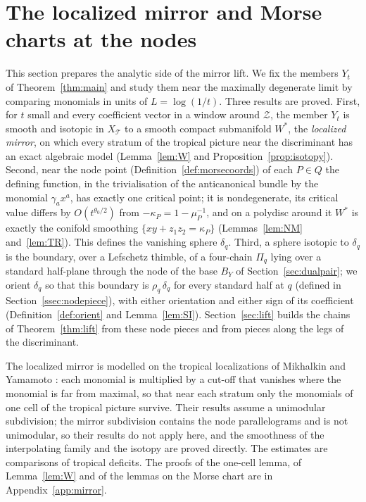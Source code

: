 \section{The localized mirror and Morse charts at the nodes}\label{sec:regime}

This section prepares the analytic side of the mirror lift. We fix the members $Y_t$ of Theorem~\ref{thm:main} and
study them near the maximally degenerate limit by comparing monomials in units of $L=\log(1/t)$. Three results are
proved. First, for $t$ small and every coefficient vector in a window around $\mathcal Z$, the member $Y_t$ is smooth
and isotopic in $X_{\mathcal T}$ to a smooth compact submanifold $W^*$, the \emph{localized mirror}, on which every
stratum of the tropical picture near the discriminant has an exact algebraic model (Lemma~\ref{lem:W} and
Proposition~\ref{prop:isotopy}). Second, near the node point (Definition~\ref{def:morsecoords}) of each $P\in Q$ the defining function,
in the trivialisation of the anticanonical bundle by the monomial $\gamma_ax^a$, has exactly one critical point; it is nondegenerate, its critical value differs by $O(t^{\theta_0/2})$ from $-\kappa_P=1-\mu_P^{-1}$,
and on a polydisc around it $W^*$ is exactly the conifold smoothing $\{xy+z_1z_2=\kappa_P\}$ (Lemmas~\ref{lem:NM}
and~\ref{lem:TR}). This defines the vanishing sphere $\delta_q$. Third, a sphere isotopic to $\delta_q$ is the
boundary, over a Lefschetz thimble, of a four-chain $\Pi_q$ lying over a standard half-plane through the node of the
base $B_Y$ of Section~\ref{sec:dualpair}; we orient $\delta_q$ so that this boundary is $\rho_q\,\delta_q$ for every
standard half at $q$ (defined in Section~\ref{ssec:nodepiece}), with either orientation and either sign of its coefficient (Definition~\ref{def:orient} and
Lemma~\ref{lem:SI}). Section~\ref{sec:lift} builds the chains of Theorem~\ref{thm:lift} from these node pieces and from
pieces along the legs of the discriminant.

The localized mirror is modelled on the tropical localizations of Mikhalkin \cite{Mikhalkin} and Yamamoto
\cite[Def.~3.1]{Ya16}: each monomial is multiplied by a cut-off that vanishes where the monomial is far from maximal, so
that near each stratum only the monomials of one cell of the tropical picture survive. Their results assume a unimodular
subdivision; the mirror subdivision contains the node parallelograms and is not unimodular, so their results do not
apply here, and the smoothness of the interpolating family and the isotopy are proved directly. The estimates are comparisons of tropical deficits. The proofs of the one-cell
lemma, of Lemma~\ref{lem:W} and of the lemmas on the Morse chart are in Appendix~\ref{app:mirror}.

